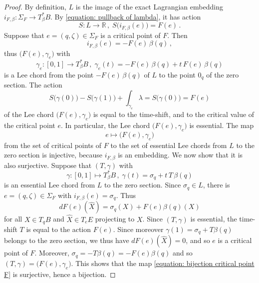 \documentclass[10pt,a4paper]{amsart}
\begin{document}
\begin{proof}
By definition,
$L$ is the image of the exact Lagrangian embedding
$i_{F, \beta}: \Sigma_F \rightarrow T^{\ast}_{\beta}B$.
By \eqref{equation: pullback of lambda},
it has action
\[
S: L \rightarrow \mathbb{R} \,,\;
S \big( i_{F, \beta} (e) \big) = F (e) \,.
\]
Suppose that $e = (q, \zeta) \in \Sigma_F$ is a critical point of $F$.
Then
\[
i_{F, \beta} (e) = - F(e) \, \beta (q) \,,
\]
thus $\big( F(e), \gamma_e \big)$ with
\[
\gamma_e: [0, 1] \rightarrow T_{\beta}^{\ast}B \,,\;
\gamma_e(t) = - F(e) \, \beta (q) + t \, F(e) \, \beta (q)
\]
is a Lee chord from the point $- F(e) \, \beta (q)$ of $L$
to the point $0_q$ of the zero section.
The action
\[
S \big(\gamma(0)\big) - S \big(\gamma(1)\big) + \int_{\gamma_e} \lambda
= S \big(\gamma(0)\big) = F(e)
\]
of the Lee chord $\big( F(e), \gamma_e \big)$
is equal to the time-shift,
and to the critical value of the critical point $e$.
In particular,
the Lee chord $\big( F(e), \gamma_e \big)$ is essential.
The map
\begin{equation}\label{equation: bijection critical point F}
e \mapsto \big( F(e), \gamma_e \big)    
\end{equation}
from the set of critical points of $F$
to the set of essential Lee chords
from $L$ to the zero section
is injective,
because $i_{F, \beta}$ is an embedding.
We now show that it is also surjective.
Suppose that $(T, \gamma)$ with
\[
\gamma: [0, 1] \mapsto T_{\beta}^{\ast}B \,,\;
\gamma (t) = \sigma_q + t \, T \, \beta (q)
\]
is an essential Lee chord from $L$ to the zero section.
Since $\sigma_q \in L$,
there is $e = (q, \zeta) \in \Sigma_F$
with $i_{F, \beta} (e) = \sigma_q$.
Thus
\[
dF (e) (\hat{X})
= \sigma_q (X) + F(e) \beta(q) (X)
\]
for all $X \in T_qB$ and $\hat{X} \in T_eE$ projecting to $X$.
Since $(T, \gamma)$ is essential,
the time-shift $T$
is equal to the action $F(e)$.
Since moreover $\gamma(1) = \sigma_q + T \beta(q)$ belongs to the zero section,
we thus have $dF(e) (\hat{X}) = 0$,
and so $e$ is a critical point of $F$.
Moreover, $\sigma_q = - T \beta(q) = - F(e) \beta(q)$
and so $(T, \gamma) = \big( F(e), \gamma_e \big)$.
This shows that the map \eqref{equation: bijection critical point F}
is surjective,
hence a bijection.


\end{proof}
\end{document}
